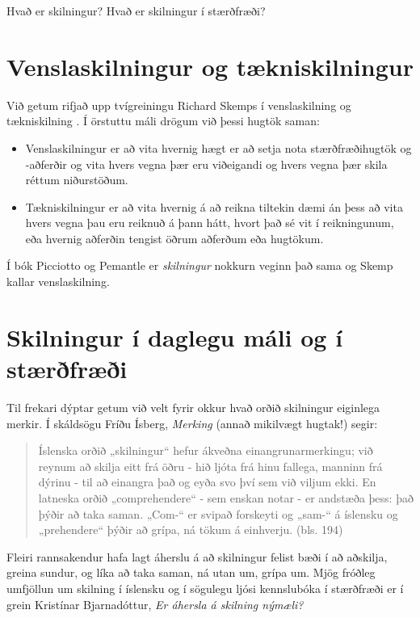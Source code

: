 \documentclass[
  icelandic,
]{book}
\providecommand{\tightlist}{%
  \setlength{\itemsep}{0pt}\setlength{\parskip}{0pt}}
\begin{document}
Hvað er skilningur? Hvað er skilningur í stærðfræði?

\section{Venslaskilningur og tækniskilningur}\label{venslaskilningur-og-tuxe6kniskilningur}

Við getum rifjað upp tvígreiningu Richard Skemps í venslaskilning og tækniskilning \autocite{skemp1976}. Í örstuttu máli drögum við þessi hugtök saman:

\begin{itemize}
\tightlist
\item
  Venslaskilningur er að vita hvernig hægt er að setja nota stærðfræðihugtök og -aðferðir og vita hvers vegna þær eru viðeigandi og hvers vegna þær skila réttum niðurstöðum.
\item
  Tækniskilningur er að vita hvernig á að reikna tiltekin dæmi án þess að vita hvers vegna þau eru reiknuð á þann hátt, hvort það sé vit í reikningunum, eða hvernig aðferðin tengist öðrum aðferðum eða hugtökum.
\end{itemize}

Í bók Picciotto og Pemantle er \emph{skilningur} nokkurn veginn það sama og Skemp kallar venslaskilning.

\section{Skilningur í daglegu máli og í stærðfræði}\label{skilningur-uxed-daglegu-muxe1li-og-uxed-stuxe6ruxf0fruxe6uxf0i}

Til frekari dýptar getum við velt fyrir okkur hvað orðið skilningur eiginlega merkir. Í skáldsögu Fríðu Ísberg, \emph{Merking} \autocite{isberg2021} (annað mikilvægt hugtak!) segir:

\begin{quote}
Íslenska orðið „skilningur`` hefur ákveðna einangrunarmerkingu; við reynum að skilja eitt frá öðru - hið ljóta frá hinu fallega, manninn frá dýrinu - til að einangra það og eyða svo því sem við viljum ekki. En latneska orðið „comprehendere`` - sem enskan notar - er andstæða þess: það þýðir að taka saman. „Com-`` er svipað forskeyti og „sam-`` á íslensku og „prehendere`` þýðir að grípa, ná tökum á einhverju. (bls. 194)
\end{quote}

Fleiri rannsakendur hafa lagt áherslu á að skilningur felist bæði í að aðskilja, greina sundur, og líka að taka saman, ná utan um, grípa um. Mjög fróðleg umfjöllun um skilning í íslensku og í sögulegu ljósi kennslubóka í stærðfræði er í grein Kristínar Bjarnadóttur, \emph{Er áhersla á skilning nýmæli?} \autocite{bjarnadottir2022}
\end{document}
